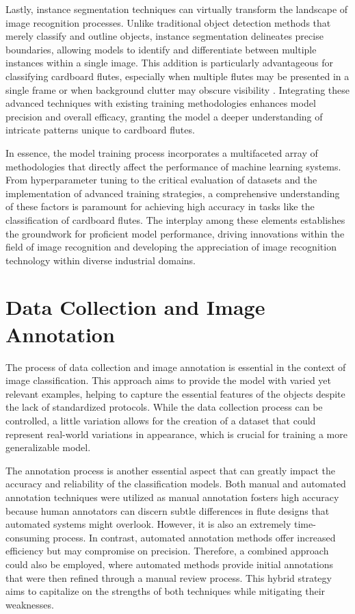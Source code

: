 Lastly, instance segmentation techniques can virtually transform the landscape of image recognition processes. Unlike traditional object detection methods that merely classify and outline objects, instance segmentation delineates precise boundaries, allowing models to identify and differentiate between multiple instances within a single image. This addition is particularly advantageous for classifying cardboard flutes, especially when multiple flutes may be presented in a single frame or when background clutter may obscure visibility \cite{he2017mask}. Integrating these advanced techniques with existing training methodologies enhances model precision and overall efficacy, granting the model a deeper understanding of intricate patterns unique to cardboard flutes.



In essence, the model training process incorporates a multifaceted array of methodologies that directly affect the performance of machine learning systems. From hyperparameter tuning to the critical evaluation of datasets and the implementation of advanced training strategies, a comprehensive understanding of these factors is paramount for achieving high accuracy in tasks like the classification of cardboard flutes. The interplay among these elements establishes the groundwork for proficient model performance, driving innovations within the field of image recognition and developing the appreciation of image recognition technology within diverse industrial domains.


\section{Data Collection and Image Annotation}

The process of data collection and image annotation is essential in the context of image classification. This approach aims to provide the model with varied yet relevant examples, helping to capture the essential features of the objects despite the lack of standardized protocols. While the data collection process can be controlled, a little variation allows for the creation of a dataset that could represent real-world variations in appearance, which is crucial for training a more generalizable model.


The annotation process is another essential aspect that can greatly impact the accuracy and reliability of the classification models. Both manual and automated annotation techniques were utilized as manual annotation fosters high accuracy because human annotators can discern subtle differences in flute designs that automated systems might overlook. However, it is also an extremely time-consuming process. In contrast, automated annotation methods offer increased efficiency but may compromise on precision. Therefore, a combined approach could also be employed, where automated methods provide initial annotations that were then refined through a manual review process. This hybrid strategy aims to capitalize on the strengths of both techniques while mitigating their weaknesses.


